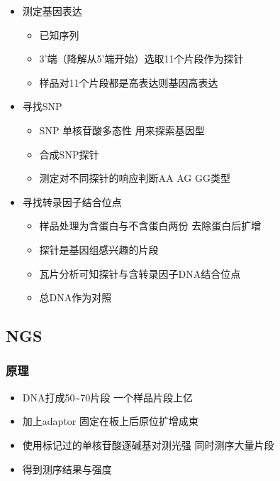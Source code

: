 \documentclass[]{book}
\providecommand{\tightlist}{%
  \setlength{\itemsep}{0pt}\setlength{\parskip}{0pt}}
\begin{document}
\begin{itemize}
\item
  测定基因表达

  \begin{itemize}
  \tightlist
  \item
    已知序列
  \item
    3'端（降解从5'端开始）选取11个片段作为探针
  \item
    样品对11个片段都是高表达则基因高表达
  \end{itemize}
\item
  寻找SNP

  \begin{itemize}
  \tightlist
  \item
    SNP 单核苷酸多态性 用来探索基因型
  \item
    合成SNP探针
  \item
    测定对不同探针的响应判断AA AG GG类型
  \end{itemize}
\item
  寻找转录因子结合位点

  \begin{itemize}
  \tightlist
  \item
    样品处理为含蛋白与不含蛋白两份 去除蛋白后扩增
  \item
    探针是基因组感兴趣的片段
  \item
    瓦片分析可知探针与含转录因子DNA结合位点
  \item
    总DNA作为对照
  \end{itemize}
\end{itemize}

\hypertarget{ngs}{%
\subsection{NGS}\label{ngs}}

\hypertarget{-1}{%
\subsubsection{原理}\label{-1}}

\begin{itemize}
\tightlist
\item
  DNA打成50\textasciitilde{}70片段 一个样品片段上亿
\item
  加上adaptor 固定在板上后原位扩增成束
\item
  使用标记过的单核苷酸逐碱基对测光强 同时测序大量片段
\item
  得到测序结果与强度
\end{itemize}
\end{document}
